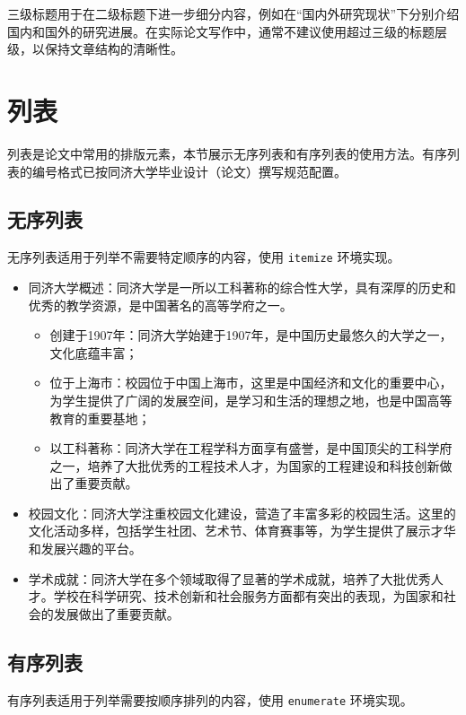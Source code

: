 三级标题用于在二级标题下进一步细分内容，例如在“国内外研究现状”下分别介绍国内和国外的研究进展。在实际论文写作中，通常不建议使用超过三级的标题层级，以保持文章结构的清晰性。

\section{列表}

列表是论文中常用的排版元素，本节展示无序列表和有序列表的使用方法。有序列表的编号格式已按同济大学毕业设计（论文）撰写规范配置。

\subsection{无序列表}

无序列表适用于列举不需要特定顺序的内容，使用 \texttt{itemize} 环境实现。

\begin{itemize}
    \item 同济大学概述：同济大学是一所以工科著称的综合性大学，具有深厚的历史和优秀的教学资源，是中国著名的高等学府之一。
    \begin{itemize}
        \item 创建于1907年：同济大学始建于1907年，是中国历史最悠久的大学之一，文化底蕴丰富；
        \item 位于上海市：校园位于中国上海市，这里是中国经济和文化的重要中心，为学生提供了广阔的发展空间，是学习和生活的理想之地，也是中国高等教育的重要基地；
        \item 以工科著称：同济大学在工程学科方面享有盛誉，是中国顶尖的工科学府之一，培养了大批优秀的工程技术人才，为国家的工程建设和科技创新做出了重要贡献。
    \end{itemize}
    \item 校园文化：同济大学注重校园文化建设，营造了丰富多彩的校园生活。这里的文化活动多样，包括学生社团、艺术节、体育赛事等，为学生提供了展示才华和发展兴趣的平台。
    \item 学术成就：同济大学在多个领域取得了显著的学术成就，培养了大批优秀人才。学校在科学研究、技术创新和社会服务方面都有突出的表现，为国家和社会的发展做出了重要贡献。
\end{itemize}

\subsection{有序列表}

有序列表适用于列举需要按顺序排列的内容，使用 \texttt{enumerate} 环境实现。

